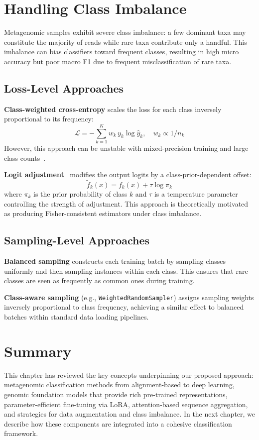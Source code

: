 \section{Handling Class Imbalance}
\label{sec:bg-imbalance}

Metagenomic samples exhibit severe class imbalance: a few dominant taxa may constitute the majority of reads while rare taxa contribute only a handful. This imbalance can bias classifiers toward frequent classes, resulting in high micro accuracy but poor macro F1 due to frequent misclassification of rare taxa.

\subsection{Loss-Level Approaches}

\textbf{Class-weighted cross-entropy} scales the loss for each class inversely proportional to its frequency:
\begin{equation}
    \mathcal{L} = -\sum_{k=1}^{K} w_k \, y_k \log \hat{y}_k, \quad w_k \propto 1/n_k
\end{equation}
However, this approach can be unstable with mixed-precision training and large class counts~\cite{Cui2019}.

\textbf{Logit adjustment}~\cite{Menon2021} modifies the output logits by a class-prior-dependent offset:
\begin{equation}
    \tilde{f}_k(x) = f_k(x) + \tau \log \pi_k
    \label{eq:logit-adjustment}
\end{equation}
where $\pi_k$ is the prior probability of class $k$ and $\tau$ is a temperature parameter controlling the strength of adjustment. This approach is theoretically motivated as producing Fisher-consistent estimators under class imbalance.

\subsection{Sampling-Level Approaches}

\textbf{Balanced sampling} constructs each training batch by sampling classes uniformly and then sampling instances within each class. This ensures that rare classes are seen as frequently as common ones during training.

\textbf{Class-aware sampling} (e.g., \texttt{WeightedRandomSampler}) assigns sampling weights inversely proportional to class frequency, achieving a similar effect to balanced batches within standard data loading pipelines.

\section{Summary}

This chapter has reviewed the key concepts underpinning our proposed approach: metagenomic classification methods from alignment-based to deep learning, genomic foundation models that provide rich pre-trained representations, parameter-efficient fine-tuning via LoRA, attention-based sequence aggregation, and strategies for data augmentation and class imbalance. In the next chapter, we describe how these components are integrated into a cohesive classification framework.
